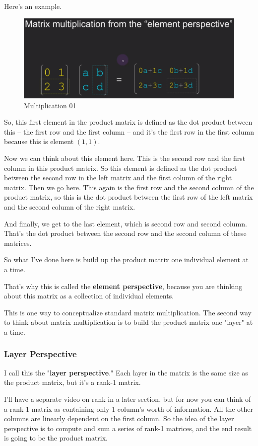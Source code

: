 \documentclass[fleqn,10pt]{olplainarticle}
\theoremstyle{definition}
\theoremstyle{remark}
\begin{document}
Here's an example.

\begin{figure}[ht]
	\centering
	\includegraphics[width=0.7\linewidth]{images/multi-01.png}
	\caption{Multiplication 01}
	\label{fig:multi_01}
\end{figure}

So, this first element in the product matrix is defined as the dot product between this -- the first row and the first column -- and it's the first row in the first column because this is element $(1,1)$.

Now we can think about this element here. This is the second row and the first column in this product matrix. So this element is defined as the dot product between the second row in the left matrix and the first column of the right matrix. Then we go here. This again is the first row and the second column of the product matrix, so this is the dot product between the first row of the left matrix and the second column of the right matrix.

And finally, we get to the last element, which is second row and second column. That's the dot product between the second row and the second column of these matrices.

So what I've done here is build up the product matrix one individual element at a time.

That's why this is called the \textbf{element perspective}, because you are thinking about this matrix as a collection of individual elements.

This is one way to conceptualize standard matrix multiplication. The second way to think about matrix multiplication is to build the product matrix one "layer" at a time.

\subsubsection*{Layer Perspective}

I call this the "\textbf{layer perspective}." Each layer in the matrix is the same size as the product matrix, but it's a rank-1 matrix.

I'll have a separate video on rank in a later section, but for now you can think of a rank-1 matrix as containing only 1 column's worth of information. All the other columns are linearly dependent on the first column. So the idea of the layer perspective is to compute and sum a series of rank-1 matrices, and the end result is going to be the product matrix.
\end{document}

